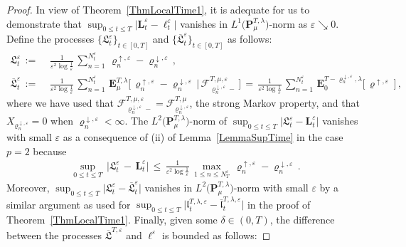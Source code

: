 \documentclass[10pt]{article}
\numberwithin{equation}{section}
\theoremstyle{definition}
\begin{document}
\begin{proof} In view of Theorem~\ref{ThmLocalTime1}, 
 it is adequate for us to demonstrate that  $\sup_{0\leq t\leq T}\big|\mathbf{L}_{t}^{\varepsilon}-\ell_{t}^{\varepsilon} \big|$ vanishes in $L^1\big( \mathbf{P}_{\mu}^{T,\lambda} \big)$-norm as $ \varepsilon\searrow 0$.
Define the processes $\{  \mathfrak{L}_t^{\varepsilon} \}_{t\in [0,T]}$ and $\{  \overline{\mathfrak{L}}_t^{\varepsilon} \}_{t\in [0, T]}$ as follows:
\begin{align*}
\mathfrak{L}_t^{\varepsilon}  \,:=\, & \, \frac{1 }{ \varepsilon^2 \log \frac{1}{\varepsilon} }\,\sum_{n=1}^{ N_{t}^{\varepsilon} }\,  \varrho_{n}^{\uparrow,\varepsilon}-\varrho_{n}^{\downarrow,\varepsilon}\,, \\
    \mathbf{\overline{\mathfrak{L}}}_{t}^{\varepsilon}\,:=\,&\,\frac{1 }{ \varepsilon^2 \log \frac{1}{\varepsilon} }\,\sum_{n=1}^{ N_{t}^{\varepsilon} }\,  \mathbf{E}_{\mu}^{T,\lambda}\Big[ \,  \varrho_{n}^{\uparrow,\varepsilon}-\varrho_{n}^{\downarrow,\varepsilon}\,\Big|\,\mathscr{F}_{ \varrho_{n}^{\downarrow,\varepsilon}- }^{T,\mu,\varepsilon} \, \Big] \,=\,\frac{1 }{ \varepsilon^2 \log \frac{1}{\varepsilon} }\,\sum_{n=1}^{ N_{t}^{\varepsilon} }\,  \mathbf{E}_{0}^{T-\varrho_{n}^{\downarrow,\varepsilon},\lambda}\big[\, \varrho^{\uparrow, \varepsilon}\,  \big]  \,,
\end{align*}
where we have used that $\mathscr{F}_{ \varrho_{n}^{\downarrow,\varepsilon}- }^{T,\mu,\varepsilon}=\mathscr{F}_{ \varrho_{n}^{\downarrow,\varepsilon} }^{T,\mu}$, the strong Markov property, and that $X_{\varrho_{n}^{\downarrow,\varepsilon}}=0$ when $\varrho_{n}^{\downarrow,\varepsilon} <\infty$.
The $L^2\big(\mathbf{P}^{T,\lambda}_{\mu}\big)$-norm of $\sup_{0\leq t\leq T}\big|\mathfrak{L}_t^{\varepsilon} -\mathbf{L}_{t}^{\varepsilon}\big|$ vanishes with small $\varepsilon$ as a consequence of (ii) of Lemma~\ref{LemmaSupTime} in the case $p=2$ because
\begin{align*}
\sup_{0\leq t\leq T}\,\big|\mathfrak{L}_t^{\varepsilon}\,-\, \mathbf{L}_{t}^{\varepsilon}  \big|\,\leq \,\frac{1 }{ \varepsilon^2 \log \frac{1}{\varepsilon} }\,\max_{1\leq n\leq N_{T}^{\varepsilon}}\,\varrho_{n}^{\uparrow,\varepsilon}-\varrho_{n}^{\downarrow,\varepsilon} \,.
\end{align*}
Moreover, $\sup_{0\leq t\leq T}\big|\mathfrak{L}_t^{\varepsilon}  - \mathbf{\overline{\mathfrak{L}}}_{t}^{\varepsilon} \big|$     vanishes in $L^2\big(\mathbf{P}^{T,\lambda}_{\mu}\big)$-norm with small   $\varepsilon $ by a similar argument as used for $\sup_{0\leq t\leq T}\big| \mathfrak{l}_t^{T,\lambda,\varepsilon} - \mathbf{\overline{\mathfrak{l}}}_{t}^{T,\lambda,\varepsilon}  \big|$ in the proof of Theorem~\ref{ThmLocalTime1}.  Finally, given some $\delta\in (0,T)$, the difference between the processes $\overline{\mathfrak{L}}^{T,\varepsilon}$ and $\ell^{\varepsilon}$ is bounded as follows: 

\end{proof}
\end{document}
